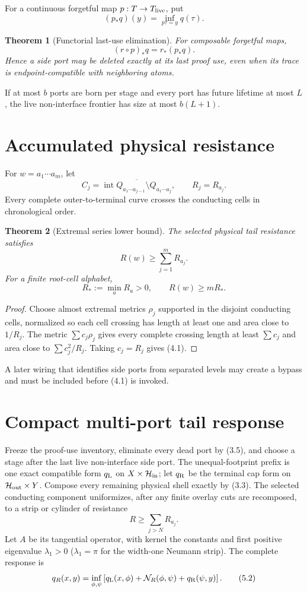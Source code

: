 \documentclass[11pt]{article}
\newtheorem{theorem}{Theorem}[section]
\theoremstyle{definition}
\theoremstyle{remark}
\begin{document}
For a continuous forgetful map $p:T\to T_{\rm live}$, put
\[
 (p_*q)(y)=\inf_{p\tau=y}q(\tau).
 \tag{3.4}
\]

\begin{theorem}[Functorial last-use elimination]
For composable forgetful maps,
\[
 (r\circ p)_*q=r_*(p_*q).
 \tag{3.5}
\]
Hence a side port may be deleted exactly at its last proof use, even when its
trace is endpoint-compatible with neighboring atoms.
\end{theorem}

If at most $b$ ports are born per stage and every port has future lifetime at
most $L$, the live non-interface frontier has size at most $b(L+1)$.

\section{Accumulated physical resistance}

For $w=a_1\cdots a_m$, let
\[
 C_j=\overline{\operatorname{int}Q_{a_1\cdots a_{j-1}}
 \setminus Q_{a_1\cdots a_j}},
 \qquad R_j=R_{a_j}.
\]
Every complete outer-to-terminal curve crosses the conducting cells in
chronological order.

\begin{theorem}[Extremal series lower bound]
The selected physical tail resistance satisfies
\[
 \boxed{R(w)\ge\sum_{j=1}^mR_{a_j}.}
 \tag{4.1}
\]
For a finite root-cell alphabet,
\[
 R_*:=\min_aR_a>0,
 \qquad R(w)\ge mR_*.
 \tag{4.2}
\]
\end{theorem}

\begin{proof}
Choose almost extremal metrics $\rho_j$ supported in the disjoint conducting
cells, normalized so each cell crossing has length at least one and area close
to $1/R_j$.  The metric $\sum c_j\rho_j$ gives every complete crossing length
at least $\sum c_j$ and area close to $\sum c_j^2/R_j$.  Taking $c_j=R_j$
gives (4.1).
\end{proof}

A later wiring that identifies side ports from separated levels may create a
bypass and must be included before (4.1) is invoked.

\section{Compact multi-port tail response}

Freeze the proof-use inventory, eliminate every dead port by (3.5), and choose a
stage after the last live non-interface side port.  The unequal-footprint prefix
is one exact compatible form $q_{\rm L}$ on $X\times\mathcal H_{\rm in}$; let
$q_{\rm R}$ be the terminal cap form on $\mathcal H_{\rm out}\times Y$.
Compose every remaining physical shell exactly by (3.3).  The selected conducting
component uniformizes, after any finite overlay cuts are recomposed, to a strip or
cylinder of resistance
\[
 R\ge\sum_{j>N}R_{a_j}.
 \tag{5.1}
\]
Let $A$ be its tangential operator, with kernel the constants and first positive
eigenvalue $\lambda_1>0$ ($\lambda_1=\pi$ for the width-one Neumann strip).
The complete response is
\[
 q_R(x,y)=\inf_{\phi,\psi}
 \left[q_{\rm L}(x,\phi)+\mathcal N_R(\phi,\psi)
 +q_{\rm R}(\psi,y)\right].
 \tag{5.2}
\]
\end{document}
